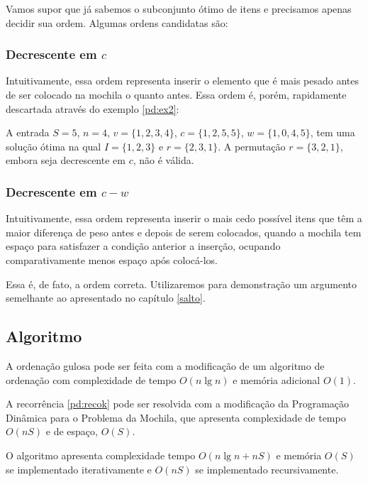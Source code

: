 Vamos supor que já sabemos o subconjunto ótimo de itens e precisamos apenas decidir sua ordem. Algumas ordens candidatas são:

\subsubsection*{Decrescente em $c$}

Intuitivamente, essa ordem representa inserir o elemento que é mais pesado antes de ser colocado na mochila o quanto antes. Essa ordem é, porém, rapidamente descartada através do exemplo \ref{pd:ex2}:

A entrada $S = 5$, $n = 4$, $v = \{1, 2, 3, 4\}$, $c = \{1, 2, 5, 5\}$, $w = \{1, 0, 4, 5\}$, tem uma solução ótima na qual $I = \{1, 2, 3\}$ e $r = \{2, 3, 1\}$. A permutação $r = \{3, 2, 1\}$, embora seja decrescente em $c$, não é válida.

\subsubsection*{Decrescente em $c - w$}

Intuitivamente, essa ordem representa inserir o mais cedo possível itens que têm a maior diferença de peso antes e depois de serem colocados,  quando a mochila tem espaço para satisfazer a condição anterior a inserção, ocupando comparativamente menos espaço após colocá-los.

Essa é, de fato, a ordem correta. Utilizaremos para demonstração um argumento semelhante ao apresentado no capítulo \ref{salto}.

\subsection{Algoritmo}

A ordenação gulosa pode ser feita com a modificação de um algoritmo de ordenação com complexidade de tempo $O(n \lg n)$ e memória adicional $O(1)$.

A recorrência \ref{pd:recok} pode ser resolvida com a modificação da Programação Dinâmica para o Problema da Mochila, que apresenta complexidade de tempo $O(nS)$ e de espaço, $O(S)$.

O algoritmo apresenta complexidade tempo $O(n \lg n + nS)$ e memória $O(S)$ se implementado iterativamente e $O(nS)$ se implementado recursivamente.

